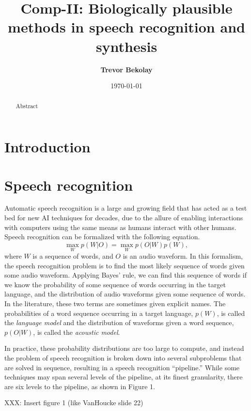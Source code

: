 \documentclass{article}
\title{Comp-II: Biologically plausible methods in speech recognition
  and synthesis}
\date{\today}
\author{\textbf{Trevor Bekolay}}
\begin{document}
\maketitle

\begin{abstract}
  Abstract
\end{abstract}

\section{Introduction}

\section{Speech recognition}

Automatic speech recognition
is a large and growing field
that has acted as a test bed
for new AI techniques for decades,
due to the allure of enabling
interactions with computers
using the same means
as humans interact with other humans.
Speech recognition can be formalized
with the following equation.
\begin{equation}
  \max_W p(W|O) = \max_W p(O|W) p(W),
\end{equation}
where $W$ is a sequence of words,
and $O$ is an audio waveform.
In this formalism, the speech recognition problem
is to find the most likely sequence of words
given some audio waveform.
Applying Bayes' rule, we can find
this sequence of words
if we know the probability
of some sequence of words occurring
in the target language,
and the distribution of audio waveforms
given some sequence of words.
In the literature, these two terms
are sometimes given explicit names.
The probabilities of a word sequence
occurring in a target language,
$p(W)$, is called the \textit{language model}
and the distribution of waveforms
given a word sequence, $p(O|W)$,
is called the \textit{acoustic model}.

In practice, these probability distributions
are too large to compute,
and instead the problem of speech recognition
is broken down into several subproblems
that are solved in sequence,
resulting in a speech recognition ``pipeline.''
While some techniques may span several levels
of the pipeline, at its finest granularity,
there are six levels to the pipeline,
as shown in Figure 1.

XXX: Insert figure 1 (like VanHoucke slide 22)
\end{document}
